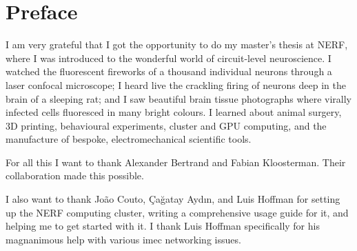 \chapter*{Preface}
\label{sec:preface}


I am very grateful that I got the opportunity to do my master's thesis at NERF\footnotemark, where I was introduced to the wonderful world of circuit-level neuroscience. I watched the fluorescent fireworks of a thousand individual  neurons through a laser confocal microscope; I heard live the crackling firing of neurons deep in the brain of a sleeping rat; and I saw beautiful brain tissue photographs where virally infected cells fluoresced in many bright colours. I learned about animal surgery, 3D printing, behavioural experiments, cluster and GPU computing, and the manufacture of bespoke, electromechanical scientific tools.

For all this I want to thank Alexander Bertrand and Fabian Kloosterman. Their collaboration made this possible.

I also want to thank Jo\~ao Couto, \c{C}a\u{g}atay Ayd{\i}n, and Luis Hoffman for setting up the NERF computing cluster, writing a comprehensive usage guide for it, and helping me to get started with it. I thank Luis Hoffman specifically for his magnanimous help with various imec networking issues.


